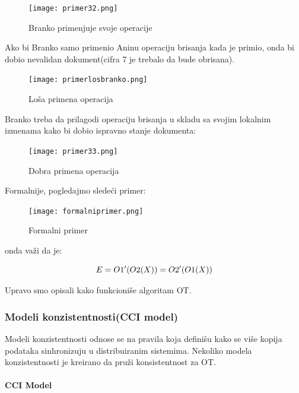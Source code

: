 \documentclass[12pt]{article}
\begin{document}
    \begin{figure}[H]
        \centering
        \texttt{[image: primer32.png]}
        \caption{Branko primenjuje svoje operacije}
        \label{fig:nls_demo}
    \end{figure}

    Ako bi Branko samo primenio Aninu operaciju brisanja kada je primio, onda bi dobio nevalidan dokument(cifra 7 je trebalo da bude obrisana). 

    \begin{figure}[H]
        \centering
        \texttt{[image: primerlosbranko.png]}
        \caption{Loša primena operacija}
        \label{fig:nls_demo}
    \end{figure}

    Branko treba da prilagodi operaciju brisanja u skladu sa svojim lokalnim izmenama kako bi dobio ispravno stanje dokumenta:

    \begin{figure}[H]
        \centering
        \texttt{[image: primer33.png]}
        \caption{Dobra primena operacija}
        \label{fig:nls_demo}
    \end{figure}

    Formalnije, pogledajmo sledeći primer:

    \begin{figure}[H]
        \centering
        \texttt{[image: formalniprimer.png]}
        \caption{Formalni primer}
        \label{fig:nls_demo}
    \end{figure}

    onda važi da je:

    \[
    \huge
    E = O1'(O2(X)) = O2'(O1(X))
    \]

    Upravo smo opisali kako funkcioniše algoritam OT.

    \subsubsection{Modeli konzistentnosti(CCI model)}

    Modeli konzistentnosti odnose se na pravila koja definišu kako se više kopija podataka sinhronizuju u distribuiranim sistemima. Nekoliko modela konzistentnosti je kreirano da pruži konsistentnost za OT.

    \paragraph{CCI Model}
\end{document}
